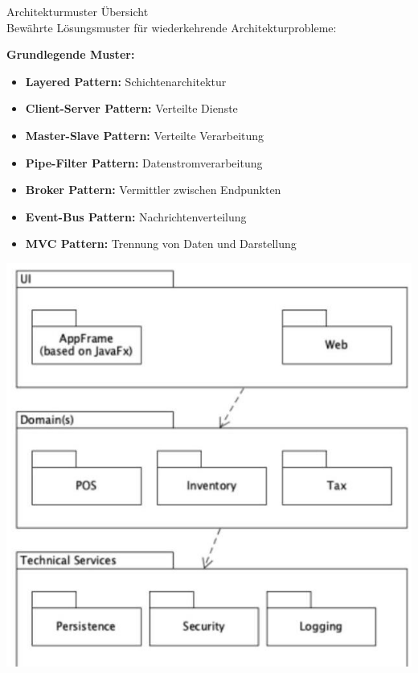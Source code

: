 \begin{concept}{Architekturmuster Übersicht}\\
Bewährte Lösungsmuster für wiederkehrende Architekturprobleme:

\textbf{Grundlegende Muster:}
\begin{itemize}
    \item \textbf{Layered Pattern:} Schichtenarchitektur
    \item \textbf{Client-Server Pattern:} Verteilte Dienste
    \item \textbf{Master-Slave Pattern:} Verteilte Verarbeitung
    \item \textbf{Pipe-Filter Pattern:} Datenstromverarbeitung
    \item \textbf{Broker Pattern:} Vermittler zwischen Endpunkten
    \item \textbf{Event-Bus Pattern:} Nachrichtenverteilung
    \item \textbf{MVC Pattern:} Trennung von Daten und Darstellung
\end{itemize}

\includegraphics[width=0.9\linewidth]{images/2024_12_29_0d1d7b5551ea1b4b41bdg-09(1)}
\end{concept}

